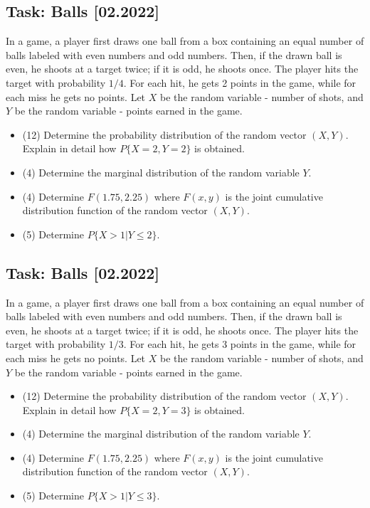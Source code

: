 \documentclass[a4paper, 12pt]{article}
\begin{document}
\subsection*{Task: Balls [02.2022]}

In a game, a player first draws one ball from a box containing an equal number of balls labeled with even numbers and odd numbers. Then, if the drawn ball is even, he shoots at a target twice; if it is odd, he shoots once. The player hits the target with probability $1/4$. For each hit, he gets 2 points in the game, while for each miss he gets no points. Let $X$ be the random variable - number of shots, and $Y$ be the random variable - points earned in the game.

\begin{itemize}
\item [a)] (12) Determine the probability distribution of the random vector $(X, Y)$. Explain in detail how $P\{X=2, Y=2\}$ is obtained.
\item [b)] (4) Determine the marginal distribution of the random variable $Y$.
\item [c)] (4) Determine $F(1.75, 2.25)$ where $F(x, y)$ is the joint cumulative distribution function of the random vector $(X, Y)$.
\item [d)] (5) Determine $P\{X > 1 | Y \leq 2\}$.
\end{itemize}



\subsection*{Task: Balls [02.2022]}

In a game, a player first draws one ball from a box containing an equal number of balls labeled with even numbers and odd numbers. Then, if the drawn ball is even, he shoots at a target twice; if it is odd, he shoots once. The player hits the target with probability $1/3$. For each hit, he gets 3 points in the game, while for each miss he gets no points. Let $X$ be the random variable - number of shots, and $Y$ be the random variable - points earned in the game.

\begin{itemize}
\item [a)] (12) Determine the probability distribution of the random vector $(X, Y)$. Explain in detail how $P\{X=2, Y=3\}$ is obtained.
\item [b)] (4) Determine the marginal distribution of the random variable $Y$.
\item [c)] (4) Determine $F(1.75, 2.25)$ where $F(x, y)$ is the joint cumulative distribution function of the random vector $(X, Y)$.
\item [d)] (5) Determine $P\{X > 1 | Y \leq 3\}$.
\end{itemize}
\end{document}
